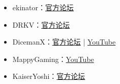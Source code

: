 \begin{itemize}
\item ekinator：\href{https://forums.terraria.org/index.php?members/ekinator.61186/}{官方论坛}
\item DRKV：\href{https://forums.terraria.org/index.php?members/drkv.67603/}{官方论坛}
\item DicemanX：\href{https://forums.terraria.org/index.php?members/dicemanx.1706/}{官方论坛} | \href{https://www.youtube.com/channel/UCllYBm-_FbqWuI92o6zPXfw}{YouTube}
\item MappyGaming：\href{https://www.youtube.com/channel/UC-u6c7ppGML6icciJ0Q1oWQ}{YouTube}
\item KaiserYoshi：\href{https://forums.terraria.org/index.php?members/kaiseryoshi.680/}{官方论坛}
\end{itemize}